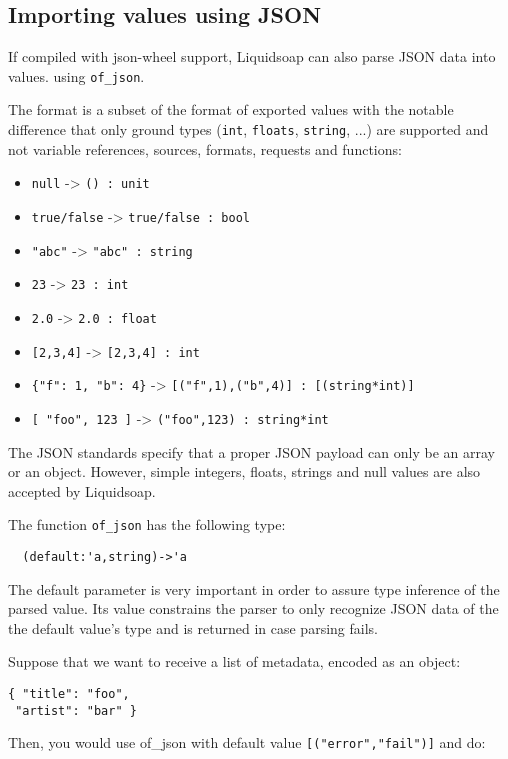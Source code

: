 \subsection{Importing values using JSON}
If compiled with json-wheel support, Liquidsoap can also
parse JSON data into values. using \verb+of_json+.

The format is a subset of the format of exported values with the notable
difference that only ground types (\verb+int+, \verb+floats+, \verb+string+, ...)
are supported and not variable references, sources, formats,
requests and functions:

\begin{itemize}
\item \verb+null+ -> \verb+() : unit+
\item \verb+true/false+ -> \verb+true/false : bool+
\item \verb+"abc"+ -> \verb+"abc" : string+
\item \verb+23+ -> \verb+23 : int+
\item \verb+2.0+ -> \verb+2.0 : float+
\item \verb+[2,3,4]+ -> \verb+[2,3,4] : int+
\item \verb+{"f": 1, "b": 4}+ -> \verb+[("f",1),("b",4)] : [(string*int)]+
\item \verb+[ "foo", 123 ]+ -> \verb+("foo",123) : string*int+

\end{itemize}
The JSON standards specify that a proper JSON payload can only be an array or an
object. However, simple integers, floats, strings and null values are
also accepted by Liquidsoap.

The function \verb+of_json+ has the following type:

\begin{verbatim}
  (default:'a,string)->'a
\end{verbatim}
The default parameter is very important in order to assure 
type inference of the parsed value. Its value constrains
the parser to only recognize JSON data of the the default value's 
type and is returned in case parsing fails.

Suppose that we want to receive a list of metadata, encoded as an object:

\begin{verbatim}
{ "title": "foo",
 "artist": "bar" }
\end{verbatim}
Then, you would use of\_json with default value \verb+[("error","fail")]+ and do:

